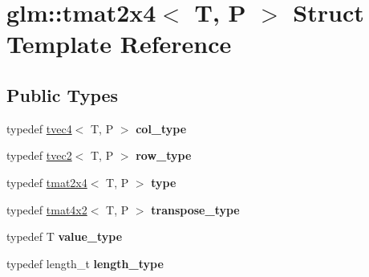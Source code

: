 \hypertarget{structglm_1_1tmat2x4}{}\section{glm\+:\+:tmat2x4$<$ T, P $>$ Struct Template Reference}
\label{structglm_1_1tmat2x4}
\subsection*{Public Types}
\begin{DoxyCompactItemize}
\item 
\mbox{\label{structglm_1_1tmat2x4_a9effcccd2c4c50c385e4c3a2fe2feedb}} 
typedef \hyperlink{structglm_1_1tvec4}{tvec4}$<$ T, P $>$ {\bfseries col\+\_\+type}
\item 
\mbox{\label{structglm_1_1tmat2x4_a3c55d4a9be73c34967ab6f5010d8ae70}} 
typedef \hyperlink{structglm_1_1tvec2}{tvec2}$<$ T, P $>$ {\bfseries row\+\_\+type}
\item 
\mbox{\label{structglm_1_1tmat2x4_a37444455c9e8f7e00973c990eec0ff21}} 
typedef \hyperlink{structglm_1_1tmat2x4}{tmat2x4}$<$ T, P $>$ {\bfseries type}
\item 
\mbox{\label{structglm_1_1tmat2x4_a00436dc5f11ba5e0bda1286402ded8be}} 
typedef \hyperlink{structglm_1_1tmat4x2}{tmat4x2}$<$ T, P $>$ {\bfseries transpose\+\_\+type}
\item 
\mbox{\label{structglm_1_1tmat2x4_a3d43dfa1bcb8be0ad095350ee71b972e}} 
typedef T {\bfseries value\+\_\+type}
\item 
\mbox{\label{structglm_1_1tmat2x4_a8d8156b982138c22047082ca7a8f9009}} 
typedef length\+\_\+t {\bfseries length\+\_\+type}
\end{DoxyCompactItemize}
